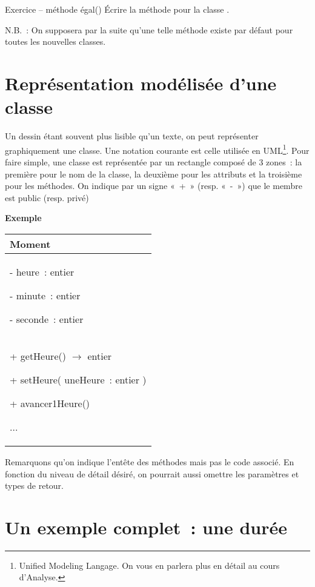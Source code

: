 	\begin{Emphase}{Exercice – méthode égal()}
		Écrire la méthode  pour la classe .
		
		N.B.~: On supposera par la suite qu'une telle méthode
		existe par défaut pour toutes les nouvelles classes.
	\end{Emphase}

\section{Représentation modélisée d'une classe}

	Un dessin étant souvent plus lisible qu'un texte, on
	peut représenter graphiquement une classe. Une notation courante est
	celle utilisée en UML\footnote{{Unified
	Modeling Langage. }On vous en parlera plus en détail au cours
	d'Analyse.}. Pour faire simple, une classe est
	représentée par un rectangle composé de 3 zones~: la première pour le
	nom de la classe, la deuxième pour les attributs et la troisième pour
	les méthodes. On indique par un signe «~+~» (resp. «~-~») que le membre
	est public (resp. privé)

	\textbf{Exemple}
	
	\begin{center}
	\begin{tabular}{|m{7cm}|}
	\hline
	\centering\arraybslash \bfseries Moment\\\hline
	{ {}- heure~: entier}
	
	{ {}- minute~: entier}
	
	 {}- seconde~: entier\\\hline
	{ + getHeure() \textsf{$\rightarrow$} entier}
	
	{ + setHeure( uneHeure~: entier )}
	
	{ + avancer1Heure()}
	
	 ...\\\hline
	\end{tabular}
	\end{center}

	Remarquons qu'on indique l'entête des méthodes mais
	pas le code associé. En fonction du niveau de détail désiré, on
	pourrait aussi omettre les paramètres et types de retour.

\section{Un exemple complet~: une durée}

